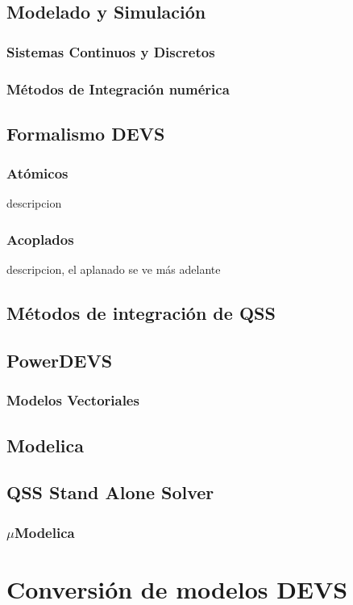 \documentclass[a4paper,	11pt]{article}
\begin{document}
\subsection{Modelado y Simulación}
\subsubsection{Sistemas Continuos y Discretos}
\subsubsection{Métodos de Integración numérica}
\subsection{Formalismo DEVS}
\subsubsection{Atómicos }
	descripcion
\subsubsection{Acoplados}
	descripcion, el aplanado se ve más adelante
\subsection {Métodos de integración de QSS}
\subsection {PowerDEVS}
\subsubsection{Modelos Vectoriales}
\subsection{Modelica}
\subsection{QSS Stand Alone Solver}
\subsubsection{$\mu$Modelica}

\section{Conversión de modelos DEVS}
\end{document}
